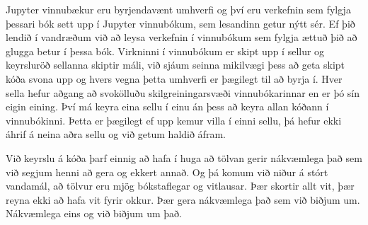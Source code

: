 Jupyter vinnubækur eru byrjendavænt umhverfi og því eru verkefnin sem fylgja þessari bók sett upp í Jupyter vinnubókum, sem lesandinn getur nýtt sér.
Ef þið lendið í vandræðum við að leysa verkefnin í vinnubókum sem fylgja ættuð þið að glugga betur í þessa bók.
Virkninni í vinnubókum er skipt upp í sellur og keyrsluröð sellanna skiptir máli, við sjáum seinna mikilvægi þess að geta skipt kóða svona upp og hvers vegna þetta umhverfi er þægilegt til að byrja í. 
Hver sella hefur aðgang að svokölluðu skilgreiningarsvæði vinnubókarinnar en er þó sín eigin eining.
Því má keyra eina sellu í einu án þess að keyra allan kóðann í vinnubókinni.
Þetta er þægilegt ef upp kemur villa í einni sellu, þá hefur ekki áhrif á neina aðra sellu og við getum haldið áfram.

Við keyrslu á kóða þarf einnig að hafa í huga að tölvan gerir nákvæmlega það sem við segjum henni að gera og ekkert annað.
Og þá komum við niður á stórt vandamál, að tölvur eru mjög bókstaflegar og vitlausar.
Þær skortir allt vit, þær reyna ekki að hafa vit fyrir okkur. 
Þær gera nákvæmlega það sem við biðjum um.
Nákvæmlega eins og við biðjum um það.

